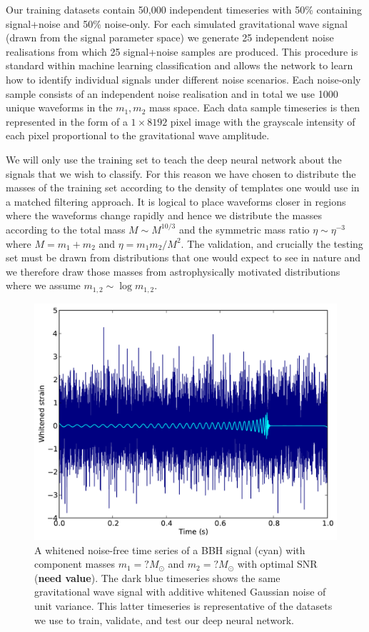 \documentclass[%
 amsmath,amssymb,
 aps,
 twocolumn,
 prl,
 reprint,
floatfix,
]{revtex4-1}
\begin{document}
%
%
Our training datasets contain 50,000 independent timeseries with 50\% containing
signal+noise and 50\% noise-only. For each simulated gravitational wave signal
(drawn from the signal parameter space) we generate 25 independent noise
realisations from which 25 signal+noise samples are produced. This procedure is
standard within machine learning classification and allows the network to learn
how to identify individual signals under different noise scenarios. Each
noise-only sample consists of an independent noise realisation and in total we
use 1000 unique waveforms in the $m_{1},m_{2}$ mass space. Each data sample
timeseries is then represented in the form of a $1 \times 8192$ pixel image
with the grayscale intensity of each pixel proportional to the gravitational
wave amplitude.

%
%
We will only use the training set to teach the deep neural network about the
signals that we wish to classify. For this reason we have chosen to distribute
the masses of the training set according to the density of templates one would
use in a matched filtering approach. It is logical to place waveforms closer in
regions where the waveforms change rapidly and hence we distribute the masses
according to the total mass $M\sim M^{10/3}$ and the symmetric mass ratio
$\eta\sim \eta^{-3}$ where $M=m_{1}+m_{2}$ and $\eta=m_{1}m_{2}/M^{2}$. The
validation, and crucially the testing set must be drawn from distributions that
one would expect to see in nature and we therefore draw those masses from
astrophysically motivated distributions where we assume $m_{1,2}\sim
\log{m_{1,2}}$.   


\begin{figure} 
\includegraphics[width=\columnwidth]{figures/waveform.pdf}
\caption{\label{fig:waveform} A whitened noise-free time series of a \ac{BBH}
signal (cyan) with component masses $m_{1}=?M_{\odot}$ and $m_{2}=?M_{\odot}$
with optimal \ac{SNR} (\textbf{need value}). The dark blue timeseries shows the
same gravitational wave signal with additive whitened Gaussian noise of unit
variance. This latter timeseries is representative of the datasets we use to
train, validate, and test our deep neural network.} 
\end{figure}
\end{document}
